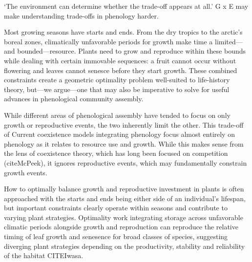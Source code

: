 \documentclass[11pt]{article}
\begin{document}
`The environment can determine whether the trade-off appears at all.' G x E may make understanding trade-offs in phenology harder. 

Most growing seasons have starts and ends. From the dry tropics to the arctic's boreal zones, climatically unfavorable periods for growth make time a limited---and bounded---resource. Plants need to grow and reproduce within these bounds while dealing with certain immovable sequences: a fruit cannot occur without flowering and leaves cannot senesce before they start growth. These combined constraints create a geometric optimality problem well-suited to life-history theory, but---we argue---one that may also be imperative to solve for useful advances in phenological community assembly. %

While different areas of phenological assembly have tended to focus on only growth or reproductive events, the two inherently limit the other. This trade-off of 
Current coexistence models integrating phenology focus almost entirely on phenology as it relates to resource use and growth. While this makes sense from the lens of coexistence theory, which has long been focused on competition (citeMcPeek), it ignores reproductive events, which may fundamentally constrain growth events. 

How to optimally balance growth and reproductive investment in plants is often approached with the starts and ends being either side of an individual's lifespan, but important constraints clearly operate within seasons and contribute to varying plant strategies. Optimality work integrating storage across unfavorable climatic periods alongside growth and reproduction can reproduce the relative timing of leaf growth and senesence for broad classes of species, suggesting diverging plant strategies depending on the productivity, stability and reliability of the habitat CITEIwasa. 
\end{document}
